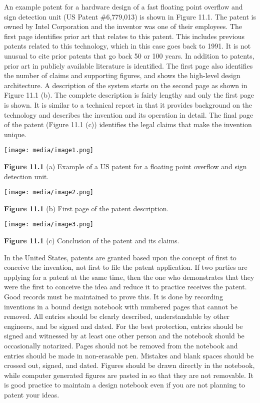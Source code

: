 An example patent for a hardware design of a fast floating point
overflow and sign detection unit (US Patent \#6,779,013) is shown in
Figure 11.1. The patent is owned by Intel Corporation and the inventor
was one of their employees. The first page identifies prior art that
relates to this patent. This includes previous patents related to this
technology, which in this case goes back to 1991. It is not unusual to
cite prior patents that go back 50 or 100 years. In addition to patents,
prior art in publicly available literature is identified. The first page
also identifies the number of claims and supporting figures, and shows
the high-level design architecture. A description of the system starts
on the second page as shown in Figure 11.1 (b). The complete description
is fairly lengthy and only the first page is shown. It is similar to a
technical report in that it provides background on the technology and
describes the invention and its operation in detail. The final page of
the patent (Figure 11.1 (c)) identifies the legal claims that make the
invention unique.

\texttt{[image: media/image1.png]}

\textbf{Figure 11.1} (a) Example of a US patent for a floating point
overflow and sign detection unit.

\texttt{[image: media/image2.png]}

\textbf{Figure 11.1} (b) First page of the patent description.

\texttt{[image: media/image3.png]}

\textbf{Figure 11.1} (c) Conclusion of the patent and its claims.

In the United States, patents are granted based upon the concept of
first to conceive the invention, not first to file the patent
application. If two parties are applying for a patent at the same time,
then the one who demonstrates that they were the first to conceive the
idea and reduce it to practice receives the patent. Good records must be
maintained to prove this. It is done by recording inventions in a bound
design notebook with numbered pages that cannot be removed. All entries
should be clearly described, understandable by other engineers, and be
signed and dated. For the best protection, entries should be signed and
witnessed by at least one other person and the notebook should be
occasionally notarized. Pages should not be removed from the notebook
and entries should be made in non-erasable pen. Mistakes and blank
spaces should be crossed out, signed, and dated. Figures should be drawn
directly in the notebook, while computer generated figures are pasted in
so that they are not removable. It is good practice to maintain a design
notebook even if you are not planning to patent your ideas.

